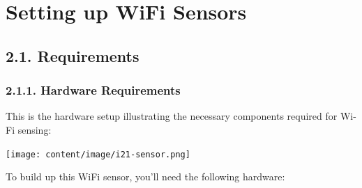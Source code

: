 \documentclass[
  letterpaper,
  DIV=11,
  numbers=noendperiod]{scrreprt}
\begin{document}

\hypertarget{section}{%
\chapter{}\label{section}}

\part{Setting up WiFi Sensors}

\hypertarget{requirements}{%
\chapter*{2.1. Requirements}\label{requirements}}


\hypertarget{hardware-requirements}{%
\section*{2.1.1. Hardware Requirements}\label{hardware-requirements}}


This is the hardware setup illustrating the necessary components
required for Wi-Fi sensing:

\texttt{[image: content/image/i21-sensor.png]}

To build up this WiFi sensor, you'll need the following hardware:
\end{document}
